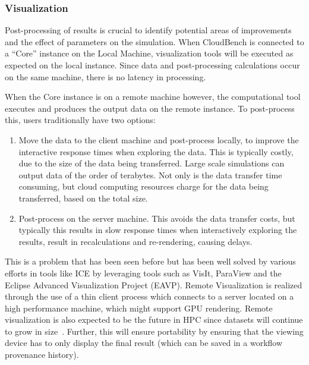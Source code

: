 \subsubsection{Visualization}
Post-processing of results is crucial to identify potential areas of 
improvements and the effect of parameters on the simulation. When CloudBench is 
connected to a ``Core'' instance on the Local Machine, visualization tools will 
be executed as expected on the local instance. Since data and post-processing 
calculations occur on the same machine, there is no latency in processing.


When the Core instance is on a remote machine however, the
computational tool executes and produces the output data on the remote
instance. To post-process this, users traditionally have two options:

\begin{enumerate}
\item Move the data to the client machine and post-process
  locally, to improve the interactive response times when exploring the data. This is typically costly, due to the size of the data being
  transferred. Large scale simulations can output data of the order of
  terabytes. Not only is the data transfer time consuming, but cloud
  computing resources charge for the data being transferred, based on
  the total size.

\item Post-process on the server machine. This avoids the data
  transfer costs, but typically this results in slow response times
  when interactively exploring the results, result in recalculations
  and re-rendering, causing delays.
\end{enumerate}

This is a problem that has been seen before but has been well solved 
by various efforts in tools like ICE by leveraging tools such as  VisIt, ParaView and the Eclipse Advanced 
Visualization Project (EAVP). Remote Visualization is realized through the use 
of a thin client process which connects to a server located on a high 
performance machine, which might support GPU rendering. Remote visualization is 
also expected to be the future in HPC since datasets will continue to grow in 
size~\cite{hpc_remote_viz}. Further, this will ensure portability by ensuring 
that the viewing device has to only display the final result (which can be saved in a workflow provenance history).

